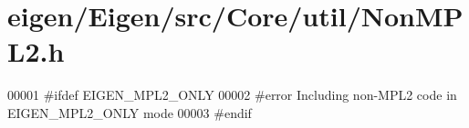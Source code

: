 \hypertarget{eigen_2_eigen_2src_2_core_2util_2_non_m_p_l2_8h_source}{}\section{eigen/\+Eigen/src/\+Core/util/\+Non\+M\+P\+L2.h}
\label{eigen_2_eigen_2src_2_core_2util_2_non_m_p_l2_8h_source}

\begin{DoxyCode}
00001 \textcolor{preprocessor}{#ifdef EIGEN\_MPL2\_ONLY}
00002 \textcolor{preprocessor}{#error Including non-MPL2 code in EIGEN\_MPL2\_ONLY mode}
00003 \textcolor{preprocessor}{#endif}
\end{DoxyCode}
